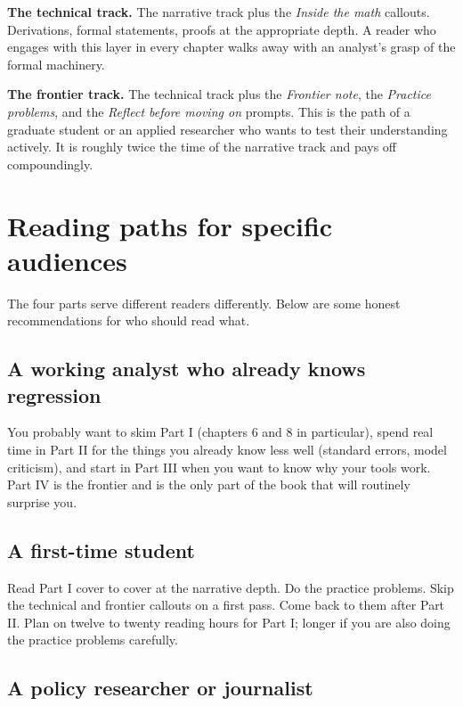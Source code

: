 \documentclass[
  letterpaper,
  11pt,
  twoside,
  openany]{scrbook}
\begin{document}
\textbf{The technical track.} The narrative track plus the \emph{Inside
the math} callouts. Derivations, formal statements, proofs at the
appropriate depth. A reader who engages with this layer in every chapter
walks away with an analyst's grasp of the formal machinery.

\textbf{The frontier track.} The technical track plus the \emph{Frontier
note}, the \emph{Practice problems}, and the \emph{Reflect before moving
on} prompts. This is the path of a graduate student or an applied
researcher who wants to test their understanding actively. It is roughly
twice the time of the narrative track and pays off compoundingly.

\section{Reading paths for specific
audiences}\label{reading-paths-for-specific-audiences}

The four parts serve different readers differently. Below are some
honest recommendations for who should read what.

\subsection{A working analyst who already knows
regression}\label{a-working-analyst-who-already-knows-regression}

You probably want to skim Part I (chapters 6 and 8 in particular), spend
real time in Part II for the things you already know less well (standard
errors, model criticism), and start in Part III when you want to know
why your tools work. Part IV is the frontier and is the only part of the
book that will routinely surprise you.

\subsection{A first-time student}\label{a-first-time-student}

Read Part I cover to cover at the narrative depth. Do the practice
problems. Skip the technical and frontier callouts on a first pass. Come
back to them after Part II. Plan on twelve to twenty reading hours for
Part I; longer if you are also doing the practice problems carefully.

\subsection{A policy researcher or
journalist}\label{a-policy-researcher-or-journalist}
\end{document}
